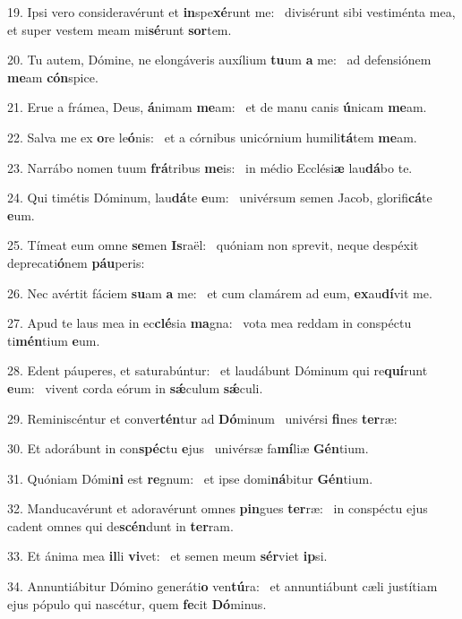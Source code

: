 19. Ipsi vero consideravérunt et \textbf{in}spe\textbf{xé}runt me: \ast\  divisérunt sibi vestiménta mea, et super vestem meam mi\textbf{sé}runt \textbf{sor}tem.\

20. Tu autem, Dómine, ne elongáveris auxílium \textbf{tu}um \textbf{a} me: \ast\  ad defensiónem \textbf{me}am \textbf{cón}spice.\

21. Erue a frámea, Deus, \textbf{á}nimam \textbf{me}am: \ast\  et de manu canis \textbf{ú}nicam \textbf{me}am.\

22. Salva me ex \textbf{o}re le\textbf{ó}nis: \ast\  et a córnibus unicórnium humili\textbf{tá}tem \textbf{me}am.\

23. Narrábo nomen tuum \textbf{frá}tribus \textbf{me}is: \ast\  in médio Ecclési\textbf{æ} lau\textbf{dá}bo te.\

24. Qui timétis Dóminum, lau\textbf{dá}te \textbf{e}um: \ast\  univérsum semen Jacob, glorifi\textbf{cá}te \textbf{e}um.\

25. Tímeat eum omne \textbf{se}men \textbf{Is}raël: \ast\  quóniam non sprevit, neque despéxit deprecati\textbf{ó}nem \textbf{páu}peris:\

26. Nec avértit fáciem \textbf{su}am \textbf{a} me: \ast\  et cum clamárem ad eum, \textbf{ex}au\textbf{dí}vit me.\

27. Apud te laus mea in ec\textbf{clé}sia \textbf{ma}gna: \ast\  vota mea reddam in conspéctu ti\textbf{mén}tium \textbf{e}um.\

28. Edent páuperes, et saturabúntur: \dag\  et laudábunt Dóminum qui re\textbf{quí}runt \textbf{e}um: \ast\  vivent corda eórum in \textbf{sǽ}culum \textbf{sǽ}culi.\

29. Reminiscéntur et conver\textbf{tén}tur ad \textbf{Dó}minum \ast\  univérsi \textbf{fi}nes \textbf{ter}ræ:\

30. Et adorábunt in con\textbf{spéc}tu \textbf{e}jus \ast\  univérsæ fa\textbf{mí}liæ \textbf{Gén}tium.\

31. Quóniam Dómi\textbf{ni} est \textbf{re}gnum: \ast\  et ipse domi\textbf{ná}bitur \textbf{Gén}tium.\

32. Manducavérunt et adoravérunt omnes \textbf{pin}gues \textbf{ter}ræ: \ast\  in conspéctu ejus cadent omnes qui de\textbf{scén}dunt in \textbf{ter}ram.\

33. Et ánima mea \textbf{il}li \textbf{vi}vet: \ast\  et semen meum \textbf{sér}viet \textbf{ip}si.\

34. Annuntiábitur Dómino generáti\textbf{o} ven\textbf{tú}ra: \ast\  et annuntiábunt cæli justítiam ejus pópulo qui nascétur, quem \textbf{fe}cit \textbf{Dó}minus.\

